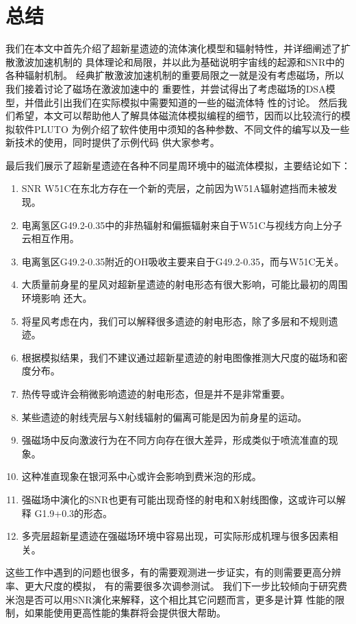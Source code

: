 \chapter{总结}
\label{Sum}

我们在本文中首先介绍了超新星遗迹的流体演化模型和辐射特性，并详细阐述了扩散激波加速机制的
具体理论和局限，并以此为基础说明宇宙线的起源和SNR中的各种辐射机制。
经典扩散激波加速机制的重要局限之一就是没有考虑磁场，所以我们接着讨论了磁场在激波加速中的
重要性，并尝试得出了考虑磁场的DSA模型，并借此引出我们在实际模拟中需要知道的一些的磁流体特
性的讨论。
然后我们希望，本文可以帮助他人了解具体磁流体模拟编程的细节，因而以比较流行的模拟软件PLUTO
为例介绍了软件使用中须知的各种参数、不同文件的编写以及一些新技术的使用，同时提供了示例代码
供大家参考。

最后我们展示了超新星遗迹在各种不同星周环境中的磁流体模拟，主要结论如下：

\begin{enumerate}

    \item SNR W51C在东北方存在一个新的壳层，之前因为W51A辐射遮挡而未被发现。

    \item 电离氢区G49.2-0.35中的非热辐射和偏振辐射来自于W51C与视线方向上分子云相互作用。

    \item 电离氢区G49.2-0.35附近的OH吸收主要来自于G49.2-0.35，而与W51C无关。

    \item 大质量前身星的星风对超新星遗迹的射电形态有很大影响，可能比最初的周围环境影响
    还大。

    \item 将星风考虑在内，我们可以解释很多遗迹的射电形态，除了多层和不规则遗迹。

    \item 根据模拟结果，我们不建议通过超新星遗迹的射电图像推测大尺度的磁场和密度分布。

    \item 热传导或许会稍微影响遗迹的射电形态，但是并不是非常重要。

    \item 某些遗迹的射线壳层与X射线辐射的偏离可能是因为前身星的运动。

    \item 强磁场中反向激波行为在不同方向存在很大差异，形成类似于喷流准直的现象。

    \item 这种准直现象在银河系中心或许会影响到费米泡的形成。

    \item 强磁场中演化的SNR也更有可能出现奇怪的射电和X射线图像，这或许可以解释
    G1.9+0.3的形态。

    \item 多壳层超新星遗迹在强磁场环境中容易出现，可实际形成机理与很多因素相关。

\end{enumerate}

这些工作中遇到的问题也很多，有的需要观测进一步证实，有的则需要更高分辨率、更大尺度的模拟，
有的需要很多次调参测试。
我们下一步比较倾向于研究费米泡是否可以用SNR演化来解释，这个相比其它问题而言，更多是计算
性能的限制，如果能使用更高性能的集群将会提供很大帮助。
